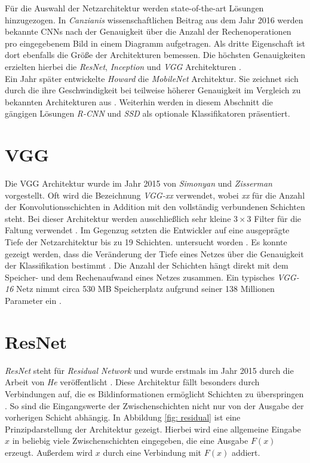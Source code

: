 		Für die Auswahl der Netzarchitektur werden state-of-the-art Lösungen hinzugezogen. In \textit{Canzianis} wissenschaftlichen Beitrag \cite{cnnvergleich} aus dem Jahr 2016 werden bekannte CNNs nach der Genauigkeit über die Anzahl der Rechenoperationen pro eingegebenem Bild in einem Diagramm aufgetragen. Als dritte Eigenschaft ist dort ebenfalls die Größe der Architekturen bemessen. Die höchsten Genauigkeiten erzielten hierbei die \textit{ResNet}, \textit{Inception} und \textit{VGG} Architekturen \cite{cnnvergleich}.\\
		
		Ein Jahr später entwickelte \textit{Howard} \cite{mobilenets} die \textit{MobileNet} Architektur. Sie zeichnet sich durch die ihre Geschwindigkeit bei teilweise höherer Genauigkeit im Vergleich zu bekannten Architekturen aus \cite{mobilenets}. Weiterhin werden in diesem Abschnitt die gängigen Lösungen \textit{R-CNN} und \textit{SSD} als optionale Klassifikatoren präsentiert.\\
		
		\section*{VGG}
		\label{subsec: vgg}
		Die VGG Architektur wurde im Jahr 2015 von \textit{Simonyan} und \textit{Zisserman} \cite{vgg} vorgestellt. Oft wird die Bezeichnung \textit{VGG-xx} verwendet, wobei \textit{xx} für die Anzahl der Konvolutionsschichten in Addition mit den vollständig verbundenen Schichten steht. Bei dieser Architektur werden ausschließlich sehr kleine $3 \times 3$ Filter für die Faltung verwendet \cite{vgg}. Im Gegenzug setzten die Entwickler auf eine ausgeprägte Tiefe der Netzarchitektur bis zu 19 Schichten. untersucht worden \cite{vgg}. Es konnte gezeigt werden, dass die Veränderung der Tiefe eines Netzes über die Genauigkeit der Klassifikation bestimmt \cite{vgg}. Die Anzahl der Schichten hängt direkt mit dem Speicher- und dem Rechenaufwand eines Netzes zusammen. Ein typisches \textit{VGG-16} Netz nimmt circa 530 MB Speicherplatz aufgrund seiner 138 Millionen Parameter ein \cite{keras}.\\
		
		\section*{ResNet}
		\label{subsec: resnet}
		\textit{ResNet} steht für \textit{Residual Network} und wurde erstmals im Jahr 2015 durch die Arbeit von \textit{He} veröffentlicht \cite{resnet}. Diese Architektur fällt besonders durch Verbindungen auf, die es Bildinformationen ermöglicht Schichten zu überspringen \cite{resnet}. So sind die Eingangswerte der Zwischenschichten nicht nur von der Ausgabe der vorherigen Schicht abhängig. In Abbildung \ref{fig: residual} ist eine Prinzipdarstellung der Architektur gezeigt. Hierbei wird eine allgemeine Eingabe $x$ in beliebig viele Zwischenschichten eingegeben, die eine Ausgabe $F(x)$ erzeugt. Außerdem wird $x$ durch eine Verbindung mit $F(x)$ addiert.
		
